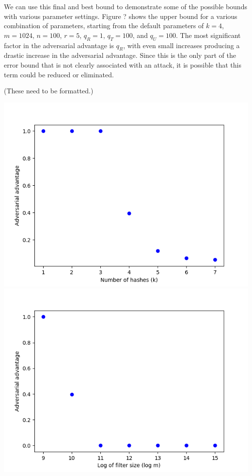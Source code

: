 We can use this final and best bound to demonstrate some of the possible bounds with various parameter settings. Figure ? shows the upper bound for a various combination of parameters, starting from the default parameters of $k = 4$, $m = 1024$, $n = 100$, $r = 5$, $q_R = 1$, $q_T = 100$, and $q_U = 100$. The most significant factor in the adversarial advantage is $q_R$, with even small increases producing a drastic increase in the adversarial advantage. Since this is the only part of the error bound that is not clearly associated with an attack, it is possible that this term could be reduced or eliminated.

(These need to be formatted.)

\includegraphics[scale=0.5]{Figure_1}
\includegraphics[scale=0.5]{Figure_2}

